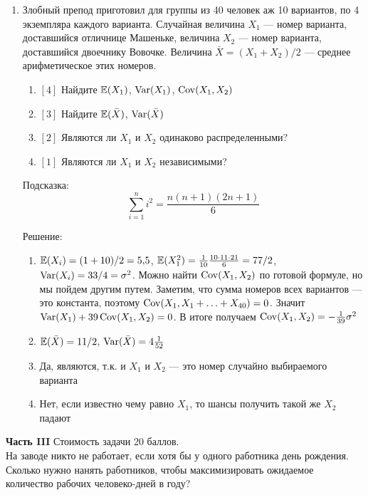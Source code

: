 \documentclass[pdftex,12pt,a4paper]{article}
\begin{document}
\begin{enumerate}
\item Злобный препод приготовил для группы из 40 человек аж 10 вариантов, по 4 экземпляра каждого варианта. Случайная величина $X_1$ --- номер варианта, доставшийся отличнице Машеньке, величина $X_2$ --- номер варианта, доставшийся двоечнику Вовочке. Величина $\bar{X}=(X_1+X_2)/2$ --- среднее арифметическое этих номеров.
\begin{enumerate}
\item $[4]$ Найдите $\mathbb{E}(X_1)$, $\operatorname{Var}(X_1)$, $\operatorname{Cov}(X_1,X_2)$
\item $[3]$ Найдите $\mathbb{E}(\bar{X})$, $\operatorname{Var}(\bar{X})$
\item $[2]$ Являются ли $X_1$ и $X_2$ одинаково распределенными?
\item $[1]$ Являются ли $X_1$ и $X_2$ независимыми?
\end{enumerate}

Подсказка:
\begin{equation}
\sum_{i=1}^{n} i^2=\frac{n(n+1)(2n+1)}{6} 
\end{equation}

Решение:
\begin{enumerate}
\item $\mathbb{E}(X_i)=(1+10)/2=5{,}5$, $\mathbb{E}(X_1^2)=\frac{1}{10}\frac{10\cdot 11\cdot 21}{6}=77/2$, $\operatorname{Var}(X_i)=33/4=\sigma^2$.
Можно найти $\operatorname{Cov}(X_1,X_2)$ по готовой формуле, но мы пойдем другим путем. Заметим, что сумма номеров всех вариантов --- это константа, поэтому $\operatorname{Cov}(X_1,X_1+\ldots+X_{40})=0$. Значит $\operatorname{Var}(X_1)+39\operatorname{Cov}(X_1,X_2)=0$. В итоге получаем $\operatorname{Cov}(X_1,X_2)=-\frac{1}{39}\sigma^2$
\item $\mathbb{E}(\bar{X})=11/2$, $\operatorname{Var}(\bar{X})=4\frac{1}{52}$
\item Да, являются, т.к. и $X_1$ и $X_2$ --- это номер случайно выбираемого варианта
\item Нет, если известно чему равно $X_1$, то шансы получить такой же $X_2$ падают
\end{enumerate}




\end{enumerate}

\textbf{Часть III} Стоимость задачи 20 баллов. \\ %


На заводе никто не работает, если хотя бы у одного работника день рождения. Сколько нужно нанять работников, чтобы максимизировать ожидаемое количество рабочих человеко-дней в году?
\end{document}
